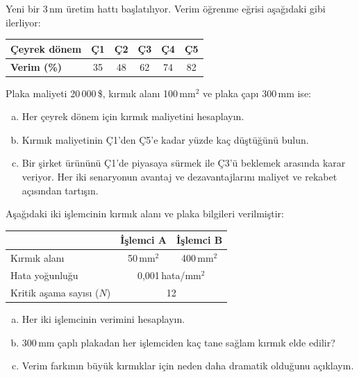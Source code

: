 \begin{alistirma}[\zor]
Yeni bir 3\,nm üretim hattı başlatılıyor. Verim öğrenme eğrisi aşağıdaki gibi ilerliyor:

\smallskip
\begin{tabular}{@{}lccccc@{}}
\toprule
\textbf{Çeyrek dönem} & Ç1 & Ç2 & Ç3 & Ç4 & Ç5 \\
\midrule
\textbf{Verim (\%)} & 35 & 48 & 62 & 74 & 82 \\
\bottomrule
\end{tabular}
\smallskip

Plaka maliyeti 20\,000\,\$, kırmık alanı 100\,mm$^2$ ve plaka çapı 300\,mm ise:
\begin{enumerate}[(a)]
    \item Her çeyrek dönem için kırmık maliyetini hesaplayın.
    \item Kırmık maliyetinin Ç1'den Ç5'e kadar yüzde kaç düştüğünü bulun.
    \item Bir şirket ürününü Ç1'de piyasaya sürmek ile Ç3'ü beklemek arasında karar veriyor. Her iki senaryonun avantaj ve dezavantajlarını maliyet ve rekabet açısından tartışın.
\end{enumerate}
\end{alistirma}

\begin{alistirma}[\orta]
Aşağıdaki iki işlemcinin kırmık alanı ve plaka bilgileri verilmiştir:

\smallskip
\begin{tabular}{@{}lcc@{}}
\toprule
 & \textbf{İşlemci A} & \textbf{İşlemci B} \\
\midrule
Kırmık alanı & 50\,mm$^2$ & 400\,mm$^2$ \\
Hata yoğunluğu & \multicolumn{2}{c}{0{,}001\,hata/mm$^2$} \\
Kritik aşama sayısı ($N$) & \multicolumn{2}{c}{12} \\
\bottomrule
\end{tabular}
\smallskip

\begin{enumerate}[(a)]
    \item Her iki işlemcinin verimini hesaplayın.
    \item 300\,mm çaplı plakadan her işlemciden kaç tane sağlam kırmık elde edilir?
    \item Verim farkının büyük kırmıklar için neden daha dramatik olduğunu açıklayın.
\end{enumerate}
\end{alistirma}

